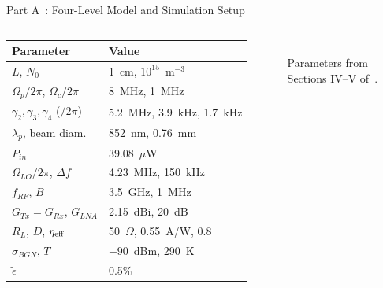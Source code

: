 \documentclass[10pt,xcolor=x11names,compress,aspectratio=169]{beamer}
\begin{document}
\begin{frame}{Part A~\cite{chen2025harnessing}: Four-Level Model and Simulation Setup}
\begin{columns}[T]
\vspace{4mm}
\footnotesize
\renewcommand{\arraystretch}{1.25}
\begin{tabular}{ll}
\toprule
\textbf{Parameter} & \textbf{Value}\\
\midrule
$L$, $N_0$ & 1~cm, $10^{15}$~m$^{-3}$\\
$\Omega_p/2\pi$, $\Omega_c/2\pi$ & 8~MHz, 1~MHz\\
$\gamma_2,\gamma_3,\gamma_4$ ($/2\pi$) & 5.2~MHz, 3.9~kHz, 1.7~kHz\\
$\lambda_p$, beam diam. & 852~nm, 0.76~mm\\
$P_{in}$ & 39.08~$\mu$W\\
$\Omega_{LO}/2\pi$, $\Delta f$ & 4.23~MHz, 150~kHz\\
$f_{RF}$, $B$ & 3.5~GHz, 1~MHz\\
$G_{Tx}=G_{Rx}$, $G_{LNA}$ & 2.15~dBi, 20~dB\\
$R_L$, $D$, $\eta_{\rm eff}$ & 50~$\Omega$, 0.55~A/W, 0.8\\
$\sigma_{BGN}$, $T$ & $-90$~dBm, 290~K\\
$\tilde\epsilon$ & 0.5\%\\
\bottomrule
\end{tabular}\\[3pt]
{\tiny Parameters from Sections IV--V of~\cite{chen2025harnessing}.}
\end{columns}
\end{frame}
\end{document}
